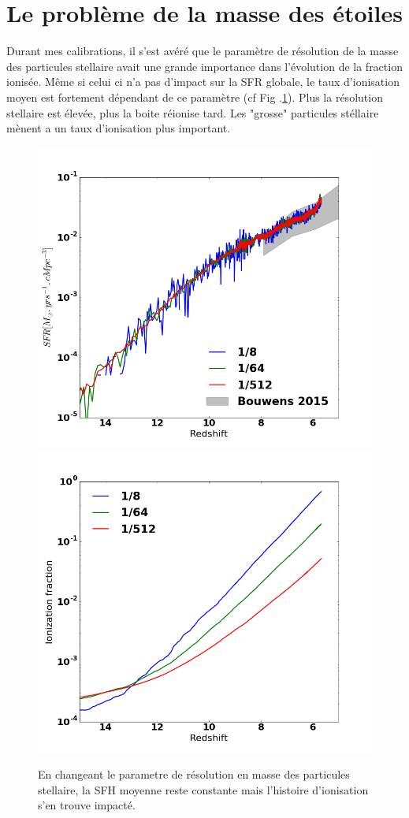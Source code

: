 \section{Le problème de la masse des étoiles}




Durant mes calibrations, il s'est avéré que le paramètre de résolution de la masse des particules stellaire avait une grande importance dans l'évolution de la fraction ionisée.
Même si celui ci n'a pas d'impact sur la SFR globale, le taux d'ionisation moyen est fortement dépendant de ce paramètre (cf Fig .\ref{fig:mstar}).
Plus la résolution stellaire est élevée, plus la boite réionise tard.
Les "grosse" particules stéllaire mènent a un taux d'ionisation plus important.


\begin{figure}[bth]
        \includegraphics[width=.45\linewidth]{img/02/Mstar_SFH.png} 
        \includegraphics[width=.45\linewidth]{img/02/Mstar_xion.png} 
        \caption{
        En changeant le parametre de résolution en masse des particules stellaire, la SFH moyenne reste constante mais l'histoire d'ionisation s'en trouve impacté.
}
 		\label{fig:mstar}
\end{figure}






